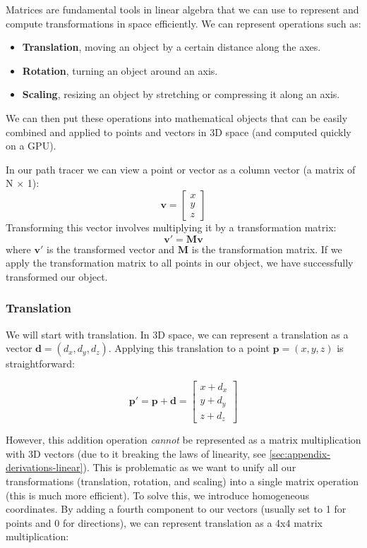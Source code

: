 \documentclass[12pt]{article}
\begin{document}
Matrices are fundamental tools in linear algebra that we can use to represent and compute transformations in space efficiently. We can represent operations such as:

\begin{itemize}
    \item \textbf{Translation}, moving an object by a certain distance along the axes.
    \item \textbf{Rotation}, turning an object around an axis.
    \item \textbf{Scaling}, resizing an object by stretching or compressing it along an axis.
\end{itemize}

We can then put these operations into mathematical objects that can be easily combined and applied to points and vectors in 3D space (and computed quickly on a GPU).

In our path tracer we can view a point or vector as a column vector (a matrix of N $\times$ 1):
\[
    \mathbf{v} = \begin{bmatrix} x \\ y \\ z \end{bmatrix}
\]
Transforming this vector involves multiplying it by a transformation matrix:
\[
    \mathbf{v}' = \mathbf{M} \mathbf{v}
\]
where \(\mathbf{v}'\) is the transformed vector and \(\mathbf{M}\) is the transformation matrix.
If we apply the transformation matrix to all points in our object, we have successfully transformed our object.

\subsubsection{Translation}

We will start with translation. In 3D space, we can represent a translation as a vector $\mathbf{d} = (d_x, d_y, d_z)$. Applying this translation to a point $\mathbf{p} = (x, y, z)$ is straightforward:

$$ \mathbf{p}' = \mathbf{p} + \mathbf{d} = \begin{bmatrix}
        x + d_x \\ y + d_y \\ z + d_z
    \end{bmatrix} $$

However, this addition operation \textit{cannot} be represented as a matrix multiplication with 3D vectors (due to it breaking the laws of linearity, see \autoref{sec:appendix-derivations-linear}). This is problematic as we want to unify all our transformations (translation, rotation, and scaling) into a single matrix operation (this is much more efficient).
To solve this, we introduce homogeneous coordinates. By adding a fourth component to our vectors (usually set to 1 for points and 0 for directions), we can represent translation as a 4x4 matrix multiplication:
\end{document}
